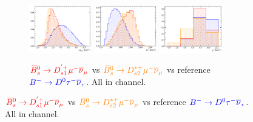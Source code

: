 \begin{figure}[!htb]
    \begin{subfigure}{\textwidth}
        \centering
        \includegraphics[width=0.3\textwidth]{figs-fit-fit-templates/histo-comp/D0_iso_D0Tau__vs__D0_iso_Ds1pMu__vs__D0_iso_Ds2Mu__m2miss.pdf}
        \includegraphics[width=0.3\textwidth]{figs-fit-fit-templates/histo-comp/D0_iso_D0Tau__vs__D0_iso_Ds1pMu__vs__D0_iso_Ds2Mu__el.pdf}
        \includegraphics[width=0.3\textwidth]{figs-fit-fit-templates/histo-comp/D0_iso_D0Tau__vs__D0_iso_Ds1pMu__vs__D0_iso_Ds2Mu__q2.pdf}
        \caption{
            $\textcolor{red}{{{\kern 0.18em\overline{\kern -0.18em B}}{}^0_{s}} \rightarrow D_{s1}^{'+}{\mu^-}{{\overline{\nu}}_\mu}}$
            vs
            $\textcolor{orange}{{{\kern 0.18em\overline{\kern -0.18em B}}{}^0_{s}} \rightarrow D_{s2}^{*+}{\mu^-}{{\overline{\nu}}_\mu}}$
            vs reference
            $\textcolor{blue}{{{{B}^-}} \rightarrow {\ensuremath{{D}^0}}{\ensuremath{\tau^-}}{\ensuremath{{\overline{\nu}}_\tau}}}$.
            All in \Dz channel.
        }
    \end{subfigure}


\end{figure}
